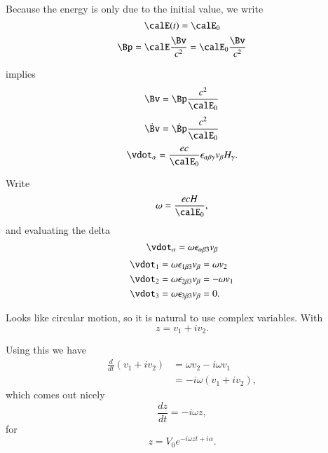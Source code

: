 {Because the energy is only due to the initial value, we write
%
\begin{equation}\label{eqn:relativisticElectrodynamicsT3:540}
\calE(t) = \calE_0
\end{equation}
%
\begin{equation}\label{eqn:relativisticElectrodynamicsT3:600}
\Bp = \calE \frac{\Bv}{c^2} = \calE_0 \frac{\Bv}{c^2}
\end{equation}

implies
%
\begin{equation}\label{eqn:relativisticElectrodynamicsT3:620}
\Bv = \Bp \frac{c^2}{\calE_0}
\end{equation}
%
\begin{equation}\label{eqn:relativisticElectrodynamicsT3:640}
\dot{\Bv} = \dot{\Bp} \frac{c^2}{\calE_0}
\end{equation}
%
\begin{equation}\label{eqn:relativisticElectrodynamicsT3:660}
\vdot_\alpha = \frac{e c}{\calE_0} \epsilon_{\alpha \beta \gamma} v_\beta H_\gamma.
\end{equation}

Write
%
\begin{equation}\label{eqn:relativisticElectrodynamicsT3:680}
\omega = \frac{e c H}{\calE_0},
\end{equation}
and evaluating the delta
\begin{equation}\label{eqn:relativisticElectrodynamicsT3:700}
\vdot_\alpha = \omega \epsilon_{\alpha \beta 3} v_\beta
\end{equation}
%
\begin{equation}\label{eqn:relativisticElectrodynamicsT3:720}
\begin{aligned}
\vdot_1 &= \omega \epsilon_{1 \beta 3} v_\beta = \omega v_2 \\
\vdot_2 &= \omega \epsilon_{2 \beta 3} v_\beta = - \omega v_1 \\
\vdot_3 &= \omega \epsilon_{3 \beta 3} v_\beta = 0.
\end{aligned}
\end{equation}

Looks like circular motion, so it is natural to use complex variables.  With
%
\begin{equation}\label{eqn:relativisticElectrodynamicsT3:740}
z = v_1 + i v_2.
\end{equation}

Using this we have
%
\begin{equation}\label{eqn:relativisticElectrodynamicsT3:1130}
\begin{aligned}
\frac{d}{dt} ( v_1 + i v_2 )
&=
\omega v_2 - i \omega v_1  \\
&= -i \omega ( v_1 + i v_2 ),
\end{aligned}
\end{equation}
which comes out nicely
%
\begin{equation}\label{eqn:relativisticElectrodynamicsT3:751}
\frac{dz}{dt} = -i \omega z,
\end{equation}
for
\begin{equation}\label{eqn:relativisticElectrodynamicsT3:780}
z = V_0 e^{-i \omega z t + i \alpha}.
\end{equation}

}

